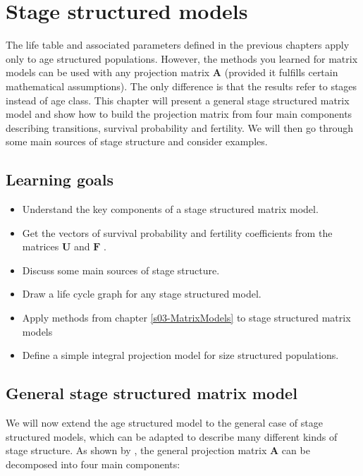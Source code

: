 \documentclass[
]{book}
\begin{document}
\hypertarget{s04-Stage}{%
\chapter{Stage structured models}\label{s04-Stage}}

The life table and associated parameters defined in the previous chapters apply only to age structured populations. However, the methods you learned for matrix models can be used with any projection matrix \(\mathbf{A}\) (provided it fulfills certain mathematical assumptions). The only difference is that the results refer to stages instead of age class. This chapter will present a general stage structured matrix model and show how to build the projection matrix from four main components describing transitions, survival probability and fertility. We will then go through some main sources of stage structure and consider examples.

\hypertarget{learning-goals-3}{%
\section{Learning goals}\label{learning-goals-3}}

\begin{itemize}
\item
  Understand the key components of a stage structured matrix model.
\item
  Get the vectors of survival probability and fertility coefficients from the matrices \(\mathbf{U}\) and \(\mathbf{F}\) .
\item
  Discuss some main sources of stage structure.
\item
  Draw a life cycle graph for any stage structured model.
\item
  Apply methods from chapter \ref{s03-MatrixModels} to stage structured matrix models
\item
  Define a simple integral projection model for size structured populations.
\end{itemize}

\hypertarget{general-stage-structured-matrix-model}{%
\section{General stage structured matrix model}\label{general-stage-structured-matrix-model}}

We will now extend the age structured model to the general case of stage structured models, which can be adapted to describe many different kinds of stage structure. As shown by \citet{Vindenes2020}, the general projection matrix \(\mathbf{A}\) can be decomposed into four main components:
\end{document}
